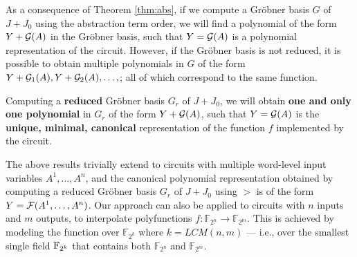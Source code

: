 As a consequence of Theorem \ref{thm:abs}, if we compute a Gr\"obner
basis $G$ of $J + J_0$ using the abstraction term order, we will find
a polynomial of the form $Y + {\mathcal{G}}(A)$ in the Gr\"obner basis, such that
$Y = {\mathcal{G}}(A)$ is a polynomial representation of the circuit. However, if
the Gr\"obner basis is not reduced, it is possible to obtain multiple
polynomials in $G$ of the form $Y + {\mathcal{G}} _1(A), Y + {\mathcal{G}} _2(A), \dots,$;
all of which correspond to the same function. 

\begin{Corollary}
Computing a {\bf reduced} Gr\"obner basis $G_r$ of $J + J_0$, we
will obtain {\bf one and only one polynomial} in $G_r$ of the form $Y
+ {\mathcal{G}}(A)$, such that $Y = {\mathcal{G}}(A)$ is the {\bf unique, minimal,
  canonical} representation of the function $f$ implemented by the
circuit.  
\end{Corollary}

The above results trivially extend to circuits with multiple
word-level input variables $A^1, \dots, A^n$, and the canonical
polynomial representation obtained by computing a reduced Gr\"obner
basis $G_r$ of $J + J_0$ using $>$ is of the form $Y = {\mathcal{F}}(A^1, \dots,
A^n)$. Our approach can also be applied to circuits with $n$ inputs
and $m$ outputs, to interpolate polyfunctions $f: {\mathbb{F}}_{2^n}
\rightarrow {\mathbb{F}}_{2^m}$. This is achieved by modeling the
function over ${\mathbb{F}}_{2^k}$ where $k = LCM(n, m)$ --- i.e.,
over the smallest single field ${\mathbb{F}}_{2^k}$ that contains both
${\mathbb{F}}_{2^n}$ and ${\mathbb{F}}_{2^m}$. 


